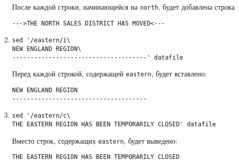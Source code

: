 \documentclass[listings]{labreport}
\begin{document}
\begin{enumerate}
После каждой строки, начинающейся на \verb|north|, будет добавлена строка
\begin{verbatim}
--->THE NORTH SALES DISTRICT HAS MOVED<---
\end{verbatim}

\item \begin{verbatim}
sed '/eastern/i\
NEW ENGLAND REGION\
-------------------------------------' datafile
\end{verbatim}

Перед каждой строкой, содержащей \verb|eastern|, будет вставлено:
\begin{verbatim}
NEW ENGLAND REGION
-------------------------------------
\end{verbatim}

\item \begin{verbatim}
sed '/eastern/c\
THE EASTERN REGION HAS BEEN TEMPORARILY CLOSED' datafile
\end{verbatim}

Вместо строк, содержащих \verb|eastern|, будет выведено:
\begin{verbatim}
THE EASTERN REGION HAS BEEN TEMPORARILY CLOSED
\end{verbatim}

\end{enumerate}
\end{document}
